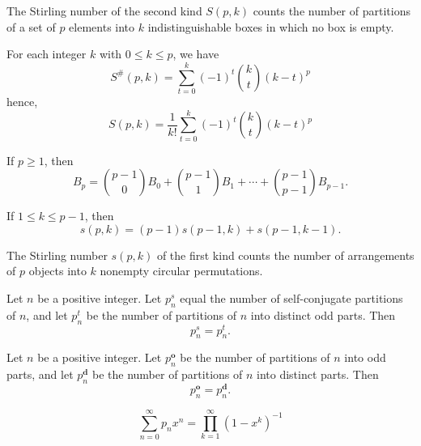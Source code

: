 \begin{theorem}
  \label{thm:8.2.5}
  The Stirling number of the second kind $S(p, k)$ counts the number of partitions of a set of $p$ 
  elements into $k$ indistinguishable boxes in which no box is empty.
\end{theorem}

\begin{theorem}
  \label{thm:8.2.6}
  For each integer $k$ with $0 \leq k \leq p$, we have
  \[ S^{\#}(p, k) = \sum\limits_{t = 0}^{k} (-1)^t \binom{k}{t}(k-t)^p \]
  hence,
  \[ S(p, k) = \frac{1}{k!}\sum\limits_{t = 0}^{k} (-1)^t \binom{k}{t}(k-t)^p \]
\end{theorem}

\begin{theorem}
  \label{thm:8.2.7}
  If $p \geq 1$, then 
  \[ B_p = \binom{p-1}{0}B_0 + \binom{p-1}{1}B_1 + \cdots + \binom{p-1}{p-1}B_{p-1}. \]
\end{theorem}

\begin{theorem}
  \label{thm:8.2.8}
  If $1 \leq k \leq p- 1$, then
  \[ s(p, k) = (p-1)s(p-1, k) + s(p-1, k-1). \]
\end{theorem}

\begin{theorem}
  \label{thm:8.2.9}
  The Stirling number $s(p, k)$ of the first kind counts the number of arrangements of $p$ objects 
  into $k$ nonempty circular permutations.
\end{theorem}

\begin{theorem}
  \label{thm:8.3.2}
  Let $n$ be a positive integer. Let $p_n^s$ equal the number of self-conjugate partitions of $n$, 
  and let $p_n^t$ be the number of partitions of $n$ into distinct odd parts. Then
  \[ p_n^s = p_n^t. \]
\end{theorem}

\begin{theorem}
  \label{thm:8.3.3}
  Let $n$ be a positive integer. Let $p_n^{\textbf{o}}$ be the number of partitions of $n$ into odd
  parts, and let $p_n^{\textbf{d}}$ be the number of partitions of $n$ into distinct parts. Then
  \[ p_n^{\textbf{o}} = p_n^{\textbf{d}}. \]
\end{theorem}

\begin{theorem}
  \label{thm:8.3.4}
  \[ \sum\limits_{n=0}^{\infty}p_nx^n = \prod\limits_{k=1}^{\infty}(1-x^k)^{-1} \]
\end{theorem}

